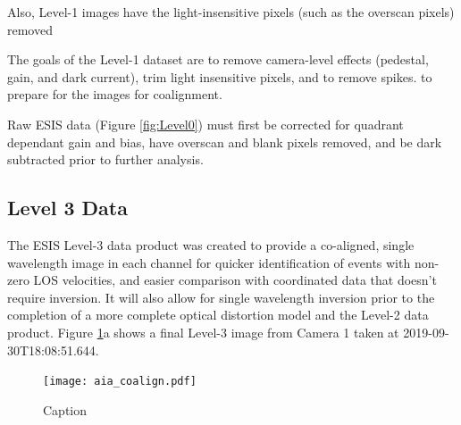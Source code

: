         
        Also, Level-1 images have the light-insensitive pixels (such as the overscan pixels) removed 
    
        The goals of the Level-1 dataset are to remove camera-level effects (pedestal, gain, and dark current), trim light insensitive pixels, and to remove spikes. to prepare for the images for coalignment.
    
       Raw ESIS data (Figure \ref{fig:Level0}) must first be corrected for quadrant dependant gain and bias, have overscan and blank pixels removed, and be dark subtracted prior to further analysis.
       


    \subsection{Level 3 Data}
 
    
    	\newcommand{\vigfit}{[0.44, 0.34, 0.38, 0.5]}
    	\newcommand{\levthreetime}{2019-09-30T18:08:51.644}
    	
    	
    	The ESIS Level-3 data product was created to provide a co-aligned, single wavelength image in each channel for quicker identification of events with non-zero LOS velocities, and easier comparison with coordinated data that doesn't require inversion. 
    	It will also allow for single wavelength inversion prior to the completion of a more complete optical distortion model and the Level-2 data product.
    	Figure \ref{fig:coalign}a shows a final Level-3 image from Camera 1 taken at \levthreetime.
    	
  		\begin{figure}[htb!]
    		\centering
    		\texttt{[image: aia\_coalign.pdf]}
    		\caption{Caption}
    		\label{fig:coalign}
    	\end{figure}
    	
